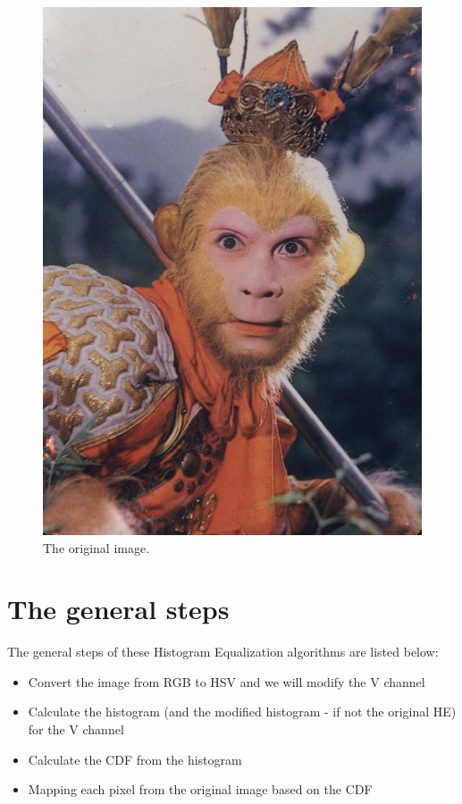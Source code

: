 \documentclass{article}
\begin{document}
	\begin{figure}
		\includegraphics[width=\linewidth]{img/original.png}
		\caption{The original image.}
		\label{fig:original}
	\end{figure}
	
	\section{The general steps}
	
	The general steps of these Histogram Equalization algorithms are listed below:
	
	\begin{itemize}
		\item Convert the image from RGB to HSV and we will modify the V channel
		\item Calculate the histogram (and the modified histogram - if not the original HE) for the V channel
		\item Calculate the CDF from the histogram
		\item Mapping each pixel from the original image based on the CDF
	\end{itemize}
	
\end{document}
